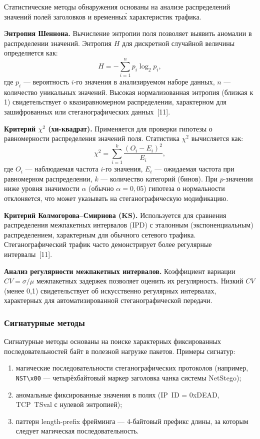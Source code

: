 Статистические методы обнаружения основаны на анализе распределений значений полей заголовков и временны\'{х} характеристик трафика.

\textbf{Энтропия Шеннона.} Вычисление энтропии поля позволяет выявить аномалии в распределении значений. Энтропия $H$ для дискретной случайной величины определяется как:
\begin{equation}
H = -\sum_{i=1}^{n} p_i \log_2 p_i,
\label{eq:shannon}
\end{equation}
где $p_i$ --- вероятность $i$-го значения в анализируемом наборе данных, $n$ --- количество уникальных значений. Высокая нормализованная энтропия (близкая к 1) свидетельствует о квазиравномерном распределении, характерном для зашифрованных или стеганографических данных~[11].

\textbf{Критерий $\chi^2$ (хи-квадрат).} Применяется для проверки гипотезы о равномерности распределения значений поля. Статистика $\chi^2$ вычисляется как:
\begin{equation}
\chi^2 = \sum_{i=1}^{k} \frac{(O_i - E_i)^2}{E_i},
\label{eq:chi_squared}
\end{equation}
где $O_i$ --- наблюдаемая частота $i$-го значения, $E_i$ --- ожидаемая частота при равномерном распределении, $k$ --- количество категорий (бинов). При $p$-значении ниже уровня значимости $\alpha$ (обычно $\alpha = 0{,}05$) гипотеза о нормальности отклоняется, что может указывать на стеганографическую модификацию.

\textbf{Критерий Колмогорова--Смирнова (KS).} Используется для сравнения распределения межпакетных интервалов (IPD) с эталонным (экспоненциальным) распределением, характерным для обычного сетевого трафика. Стеганографический трафик часто демонстрирует более регулярные интервалы~[11].

\textbf{Анализ регулярности межпакетных интервалов.} Коэффициент вариации $CV = \sigma / \mu$ межпакетных задержек позволяет оценить их регулярность. Низкий $CV$ (менее 0{,}1) свидетельствует об искусственно регулярных интервалах, характерных для автоматизированной стеганографической передачи.

\subsubsection{Сигнатурные методы}

Сигнатурные методы основаны на поиске характерных фиксированных последовательностей байт в полезной нагрузке пакетов. Примеры сигнатур:
\begin{enumerate}[label=\arabic*)]
  \item магические последовательности стеганографических протоколов (например, \texttt{NST\textbackslash x00} --- четырёхбайтовый маркер заголовка чанка системы NetStego);
  \item аномальные фиксированные значения в полях (IP~ID = 0xDEAD, TCP~TSval с нулевой энтропией);
  \item паттерн length-prefix фрейминга --- 4-байтовый префикс длины, за которым следует магическая последовательность.
\end{enumerate}

